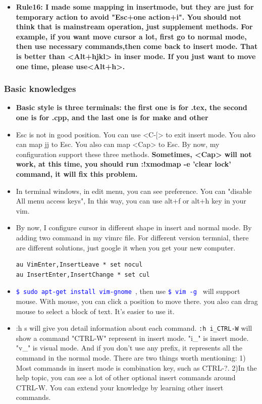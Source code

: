 \documentclass[a4paper,11pt,twoside]{book}
\newcommand{\linuxcommand}[1]{\texttt{\textcolor{blue}{\$ #1 \Pisymbol{psy}{191}}}}
\begin{document}
\begin{itemize}
		\item \textbf{Rule16: I made some mapping in insertmode, but they are just for temporary action to avoid "Esc+one action+i". You should not think that is mainstream operation, just supplement methods. For example, if you want move cursor a lot, first go to normal mode, then use necessary commands,then come back to insert mode. That is better than <Alt+hjkl> in inser mode. If you just want to move one time, please use<Alt+h>.}


\end{itemize}

\subsubsection{Basic knowledges}
\begin{itemize}
		\item \textbf{Basic style is three terminals: the first one is for .tex, the second one is for .cpp, and the last one is for make and other}

		\item Esc is not in good position. You can use <C-$[$> to exit insert mode. You also can map jj to Esc. You also can map <Cap> to Esc. By now, my configuration support these three methods. \textbf{Sometimes, <Cap> will not work, at this time, you should run :!xmodmap -e 'clear lock' command, it will fix this problem.}

		\item In terminal windows, in edit menu, you can see preference. You can "disable All menu access keys", In this way, you can use alt+f or alt+h key in your vim. 

		\item By now, I configure cursor in different shape in insert and normal mode. By adding two command in my vimrc file. For different version termnial, there are different solutions, just google it when you get your new computer.
\begin{verbatim}
au VimEnter,InsertLeave * set nocul
au InsertEnter,InsertChange * set cul
\end{verbatim} 		

		\item \linuxcommand{sudo apt-get install vim-gnome}, then use \linuxcommand{vim -g} will support mouse.  With mouse, you can click a position to move there. you also can drag mouse to select a block of text. It's easier to use it.  

		\item :h s will give you detail information about each command. \verb=:h i_CTRL-W= will show a command "CTRL-W" represent in insert mode. "i\_" is insert mode. "v\_" is visual mode. And if you don't use any prefix, it represents all the command in the normal mode. There are two things worth mentioning: 1) Most commands in insert mode is combination key, such as CTRL-?. 2)In the help topic, you can see a lot of other optional insert commands around CTRL-W. You can extend your knowledge by learning other insert commands.


\end{itemize}
\end{document}
